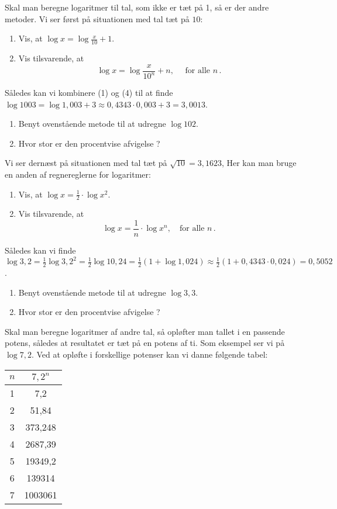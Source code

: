 \documentclass[12pt,oneside,a4paper]{article}
\theoremstyle{plain}
\begin{document}
Skal man beregne logaritmer til tal, som ikke er tæt på 1, så er der andre metoder.
Vi ser først på situationen med tal tæt på $10$:

\begin{enumerate}[label=(\alph*), resume]
    \item Vis, at $\log x = \log\frac{x}{10} + 1$.
    \item Vis tilsvarende, at 
        \[
            \tag{4}
            \log x = \log\frac{x}{10^n} + n,\quad\mbox{ for alle $n$}\,.
        \]

\end{enumerate}
Således kan vi kombinere (1) og (4) til at finde $\log 1003 = \log 1,003 + 3
\approx 0,4343\cdot 0,003 + 3 = 3,0013$.
\begin{enumerate}[label=(\alph*), resume]
    \item Benyt ovenstående metode til at udregne $\log 102$.
    \item Hvor stor er den procentvise afvigelse ?
\end{enumerate}

Vi ser dernæst på situationen med tal tæt på $\sqrt{10} = 3,1623$, Her kan man
bruge en anden af regnereglerne for logaritmer:
\begin{enumerate}[label=(\alph*), resume]
    \item Vis, at $\log x = \frac12 \cdot \log x^2$.
    \item Vis tilsvarende, at
        \[
            \tag{5}
            \log x = \frac1n \cdot \log x^n,\quad \mbox{for alle $n$}\,.
        \]
\end{enumerate}
Således kan vi finde $\log 3,2 = \frac12 \log 3,2^2 = \frac12 \log 10,24
 = \frac12 (1 + \log 1,024) \approx \frac12 (1 + 0,4343\cdot 0,024)
 = 0,5052$.
\begin{enumerate}[label=(\alph*), resume]
    \item Benyt ovenstående metode til at udregne $\log 3,3$.
    \item Hvor stor er den procentvise afvigelse ?
\end{enumerate}

Skal man beregne logaritmer af andre tal, så opløfter man tallet i en passende
potens, således at resultatet er tæt på en potens af ti. Som eksempel ser vi på
$\log 7,2$. Ved at opløfte i forskellige potenser kan vi danne følgende tabel:

\begin{tabular}{|c|c|}
    \hline
    $n$ & $7,2^n$ \\
    \hline
    1 & 7,2 \\
    \hline
    2 & 51,84 \\
    \hline
    3 & 373,248 \\
    \hline
    4 & 2687,39 \\
    \hline
    5 & 19349,2 \\
    \hline
    6 & 139314 \\
    \hline
    7 & 1003061 \\
    \hline
\end{tabular}
\end{document}
